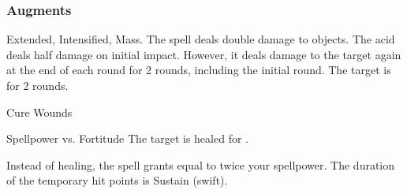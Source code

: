 \subsubsection{Augments}
 Extended, Intensified, Mass.
The spell deals double damage to objects.
The acid deals half damage on initial impact.
However, it deals damage to the target again at the end of each round for 2 rounds, including the initial round.
The target is  for 2 rounds.
\begin{spellsection}{Cure Wounds}
\begin{spellcontent}
\begin{spelltargetinginfo}
\end{spelltargetinginfo}
\begin{spelleffects}
\begin{spellattack}{Spellpower vs. Fortitude}
\spellsuccess The target is healed for \spelldamage{}.
\end{spellattack}
\end{spelleffects}
\end{spellcontent}
\begin{spellfooter}
\miscastexplode
\end{spellfooter}
\begin{spellcantrip}
Instead of healing, the spell grants  equal to twice your spellpower.
The duration of the temporary hit points is Sustain (swift).
\end{spellcantrip}
\end{spellsection}
